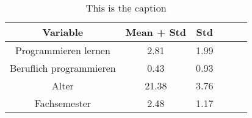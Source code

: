 \begin{table}
\centering
\caption{This is the caption}
\label{tab:table_label}
\begin{tabular}{cccccc}
\toprule
               Variable &  Mean + Std &  Std \\
\midrule
   Programmieren lernen &        2.81 & 1.99 \\
Beruflich programmieren &        0.43 & 0.93 \\
                  Alter &       21.38 & 3.76 \\
           Fachsemester &        2.48 & 1.17 \\
\bottomrule
\end{tabular}
\end{table}
